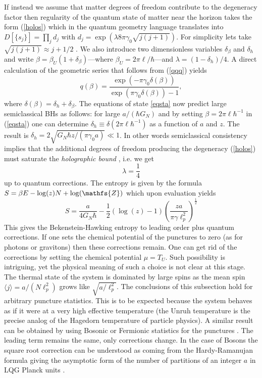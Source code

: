 \documentclass[aps, nofootinbib,superscriptaddress,12pt]{revtex4-2}
\newcommand{\va}{\scriptscriptstyle}
\newcommand{\nn}{\sqrt{j(j+1)}}
\def\be{\begin{equation}}
\def\ee{\end{equation}}
\newcommand{\mfs}[1]{\mathfs {#1}}                               %
\newcommand{\sZ}{{\mfs Z}}
\begin{document}
If instead we assume that matter degrees of freedom contribute to the degeneracy factor then regularity of the quantum state of matter near the horizon takes the form (\ref{holos}) which in the quantum geometry language translates into $D[\{s_j\}]=\prod_j d_j$ with $d_j=\exp(\lambda 8\pi \gamma_0\nn)$. For simplicity lets take $\nn\approx j+1/2$ \cite{FernandoBarbero:2009ai}. We also introduce 
two dimensionless variables $\delta_{\beta}$ and $\delta_{h}$ and write
$\beta=\beta_{\va U}(1+\delta_\beta)$---where $\beta_{U}=2\pi \ell/\hbar$---and $\lambda=(1-\delta_h)/4$.
A direct calculation of the geometric series that follows from (\ref{qqq}) yields
\be
q(\beta)
=\frac{\exp(-\pi\gamma_0\delta(\beta))}{\exp(\pi\gamma_0\delta(\beta))-1},
\ee
where $\delta(\beta)=\delta_h+\delta_{\beta}$. The equations of state \eqref{eqsta} now predict large semiclassical 
BHs as follows: for large $a/(\hbar G_N)$ and by setting $\beta=2\pi \ell\hbar^{-1}$ in (\ref{eqsta}) one can determine $\delta_h\equiv \delta(2\pi\ell\hbar^{-1})$ as a function of $a$ and $z$. The result is
$\delta_h=2\sqrt{{G_N \hbar z}/({\pi\gamma_0 a})}\ll 1$. 
In other words semiclassical consistency implies that the additional degrees of freedom producing the degeneracy (\ref{holos}) must saturate the {\em holographic bound}  \cite{Ghosh:2013iwa}, i.e. we get 
\be\label{llalla} \lambda=\frac{1}{4}\ee up to quantum corrections. The entropy is given by the formula $S=\beta E-\log(z) N+\log(\sZ)$ which upon evaluation yields
\be
S=\frac{a}{4G_N\hbar} - \frac{1}{2}(\log(z)-1) \left({\frac{z a}{\pi \gamma \ell_p^2}}\right)^{\frac{1}{2}}
\ee
This gives the Bekenstein-Hawking entropy to leading order plus 
quantum corrections. If one sets the chemical potential of the punctures to zero (as for photons or gravitons)
then these corrections remain. One can get rid of the corrections by setting the chemical potential 
$\mu=T_U$. Such possibility is intriguing, yet the physical meaning of such a choice is not clear at this stage. 
The thermal state of the system is dominated by large spins as the mean spin $\langle j\rangle = a/(N\ell_p^2)$ grows like $\sqrt{a/\ell_p^2}$.
The conclusions of this subsection hold for arbitrary puncture statistics. This is to be expected because the system behaves as if it were at a very high effective temperature  (the Unruh temperature is the precise analog of 
    the Hagedorn temperature \cite{Hagedorn:1965st} of particle physics). A similar result can be obtained by using Bosonic or Fermionic statistics for the punctures \cite{Ghosh:2013iwa}. The leading term remains the same, only corrections change.
    In the case of Bosons the square root correction can be understood as coming from the Hardy-Ramanujan formula giving the asymptotic form of the number of partitions of an integer $a$ in LQG Planck units \cite{Asin:2014gta}.
\end{document}
